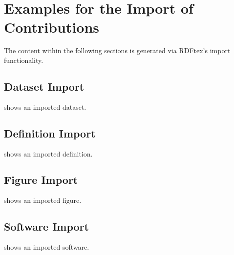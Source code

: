 
\section{Examples for the Import of Contributions}

The content within the following sections is generated via RDFtex's import functionality.

\subsection{Dataset Import}


 shows an imported dataset.

\subsection{Definition Import}


 shows an imported definition.

\subsection{Figure Import}


 shows an imported figure.

\subsection{Software Import}


 shows an imported software.


